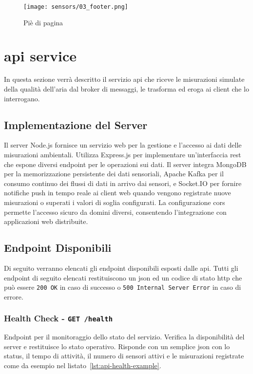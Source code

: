\begin{figure}[H]
  \centering
  \texttt{[image: sensors/03\_footer.png]}
  \caption{Piè di pagina}
  \label{fig:sensors-footer}
\end{figure}

\section{\acrshort{api} service}

In questa sezione verrà descritto il servizio \acrshort{api} che riceve le misurazioni simulate della qualità dell'aria
dal broker di messaggi, le trasforma ed eroga ai client che lo interrogano.

\subsection{Implementazione del Server}

Il server Node.js fornisce un servizio web per la gestione e l'accesso ai dati delle misurazioni ambientali.
Utilizza Express.js per implementare un'interfaccia \acrshort{rest} che espone diversi endpoint per le operazioni sui dati.
Il server integra MongoDB per la memorizzazione persistente dei dati sensoriali, Apache Kafka per il consumo
continuo dei flussi di dati in arrivo dai sensori, e Socket.IO per fornire notifiche push in tempo reale ai client web
quando vengono registrate nuove misurazioni o superati i valori di soglia configurati. La configurazione \acrshort{cors}
permette l'accesso sicuro da domini diversi, consentendo l'integrazione con applicazioni web distribuite.

\subsection{Endpoint Disponibili}

Di seguito verranno elencati gli endpoint disponibili esposti dalle \acrshort{api}.
Tutti gli endpoint di seguito elencati restituiscono un \acrshort{json} ed un codice di stato \acrshort{http} che può
essere \texttt{200 OK} in caso di successo o \texttt{500 Internal Server Error} in caso di errore.

\subsubsection{Health Check - \texttt{GET /health}}

Endpoint per il monitoraggio dello stato del servizio.
Verifica la disponibilità del server e restituisce lo stato operativo.
Risponde con un semplice \acrshort{json} con lo status, il tempo di attività, il numero di sensori attivi e le
misurazioni registrate come da esempio nel listato~\ref{lst:api-health-example}.

